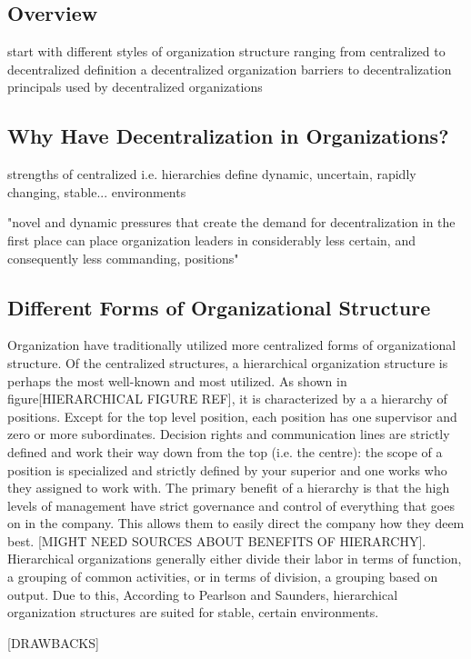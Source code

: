 \subsection{Overview}
start with different styles of organization structure ranging from centralized to decentralized
definition a decentralized organization
barriers to decentralization
principals used by decentralized organizations


\subsection{Why Have Decentralization in Organizations?}
strengths of centralized i.e. hierarchies
define dynamic, uncertain, rapidly changing, stable... environments

"novel and dynamic pressures that create the demand for decentralization in the first place can place organization leaders in considerably less certain, and consequently less commanding, positions"

\subsection{Different Forms of Organizational Structure}
\label{org:form}

Organization have traditionally utilized more centralized forms of organizational structure. Of the centralized structures, a hierarchical organization structure is perhaps the most well-known and most utilized. As shown in figure[HIERARCHICAL FIGURE REF], it is characterized by a a hierarchy of positions. Except for the top level position, each position has one supervisor and zero or more subordinates. Decision rights and communication lines are strictly defined and work their way down from the top (i.e. the centre): the scope of a position is specialized and strictly defined by your superior and one works who they assigned to work with. The primary benefit of a hierarchy is that the high levels of management have strict governance and control of everything that goes on in the company. This allows them to easily direct the company how they deem best. [MIGHT NEED SOURCES ABOUT BENEFITS OF HIERARCHY]. Hierarchical organizations generally either divide their labor in terms of function, a grouping of common activities, or in terms of division, a grouping based on output. Due to this, According to Pearlson and Saunders, hierarchical organization structures are suited for stable, certain environments. ~\cite{pearlson2009}

[DRAWBACKS]

